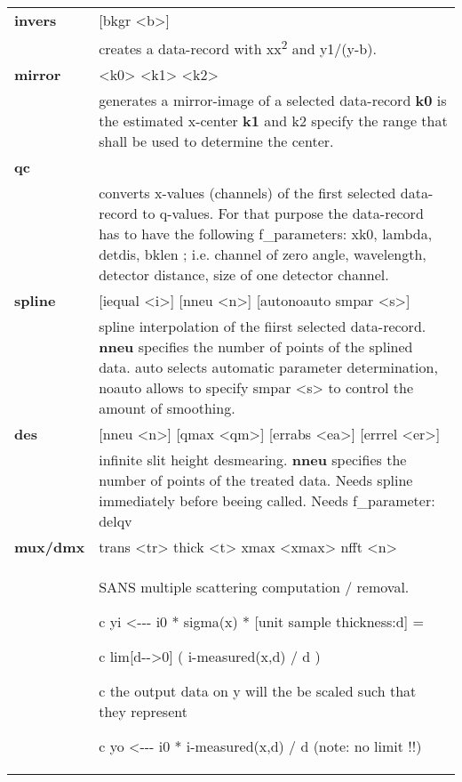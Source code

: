 \documentclass[]{article}
\begin{document}
\begin{longtable}[]{@{}ll@{}}
\toprule
\endhead
\textbf{invers} & {[}bkgr \textless{}b\textgreater{}{]}\tabularnewline
& creates a data-record with xx\textsuperscript{2} and
y1/(y-b).\tabularnewline
\textbf{mirror} & \textless{}k0\textgreater{}
\textless{}k1\textgreater{} \textless{}k2\textgreater{}\tabularnewline
& generates a mirror-image of a selected data-record \textbf{k0} is the
estimated x-center \textbf{k1} and k2 specify the range that shall be
used to determine the center.\tabularnewline
\textbf{qc} &\tabularnewline
& converts x-values (channels) of the first selected data-record to
q-values. For that purpose the data-record has to have the following
f\_parameters: xk0, lambda, detdis, bklen ; i.e. channel of zero angle,
wavelength, detector distance, size of one detector
channel.\tabularnewline
\textbf{spline} & {[}iequal \textless{}i\textgreater{}{]} {[}nneu
\textless{}n\textgreater{}{]} {[}auto\textbar{}noauto smpar
\textless{}s\textgreater{}{]}\tabularnewline
& spline interpolation of the fiirst selected data-record. \textbf{nneu}
specifies the number of points of the splined data. auto selects
automatic parameter determination, noauto allows to specify smpar
\textless{}s\textgreater{} to control the amount of
smoothing.\tabularnewline
\textbf{des} & {[}nneu \textless{}n\textgreater{}{]} {[}qmax
\textless{}qm\textgreater{}{]} {[}errabs \textless{}ea\textgreater{}{]}
{[}errrel \textless{}er\textgreater{}{]}\tabularnewline
& infinite slit height desmearing. \textbf{nneu} specifies the number of
points of the treated data. Needs spline immediately before beeing
called. Needs f\_parameter: delqv\tabularnewline
\textbf{mux/dmx} & trans \textless{}tr\textgreater{} thick
\textless{}t\textgreater{} xmax \textless{}xmax\textgreater{} nfft
\textless{}n\textgreater{}\tabularnewline
\begin{minipage}[t]{0.47\columnwidth}\raggedright
\strut
\end{minipage} & \begin{minipage}[t]{0.47\columnwidth}\raggedright
SANS multiple scattering computation / removal.

c yi \textless{}-\/-\/- i0 * sigma(x) * {[}unit sample thickness:d{]} =

c lim{[}d-\/-\textgreater{}0{]} ( i-measured(x,d) / d )

c the output data on y will the be scaled such that they represent

c yo \textless{}-\/-\/- i0 * i-measured(x,d) / d (note: no limit !!)


\end{minipage}
\end{longtable}
\end{document}
